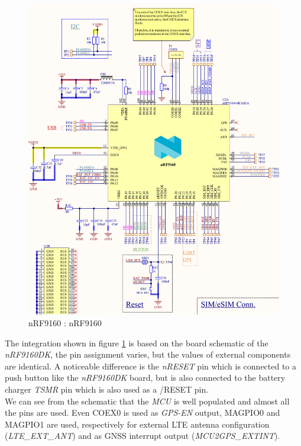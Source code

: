 \documentclass[report.tex]{subfiles}
\begin{document}
\begin{figure}[H]
	\centering
	\includegraphics[width=1\textwidth, angle=0]{Include/Figure/Hardware/LTEWatch_nRF9160_nRF9160}
	\caption{nRF9160 : nRF9160}
	\label{fig:LTEWatch_nRF9160_nRF9160}
\end{figure}

\pagebreak

The integration shown in figure \ref{fig:LTEWatch_nRF9160_nRF9160} is based on the board schematic of the \textit{nRF9160DK}\cite{nRF9160DK}, the pin assignment varies, but the values of external components are identical. A noticeable difference is the \textit{nRESET} pin which is connected to a push button like the \textit{nRF9160DK} board, but is also connected to the battery charger \textit{TSMR} pin which is also used as a /RESET pin. \\

We can see from the schematic that the \textit{MCU} is well populated and almost all the pins are used. Even COEX0 is used as \textit{GPS-EN} output, MAGPIO0 and MAGPIO1 are used, respectively for external LTE antenna configuration (\textit{LTE\_EXT\_ANT}) and as GNSS interrupt output (\textit{MCU2GPS\_EXTINT}).\\
\end{document}
